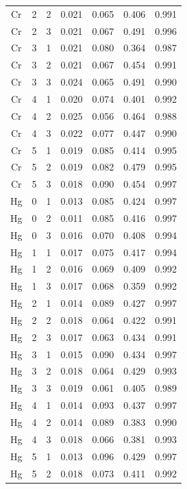 \documentclass[ms, hidelinks]{uncgdissertationexp}
\theoremstyle{plain}
\theoremstyle{definition}
\theoremstyle{remark}
\begin{document}
\begin{longtable}{ccccccc}
Cr & 2 & 2 & 0.021 & 0.065 & 0.406 & 0.991\\
\rowcolor{gray!6}  Cr & 2 & 3 & 0.021 & 0.067 & 0.491 & 0.996\\
Cr & 3 & 1 & 0.021 & 0.080 & 0.364 & 0.987\\
\rowcolor{gray!6}  Cr & 3 & 2 & 0.021 & 0.067 & 0.454 & 0.991\\
Cr & 3 & 3 & 0.024 & 0.065 & 0.491 & 0.990\\
\rowcolor{gray!6}  Cr & 4 & 1 & 0.020 & 0.074 & 0.401 & 0.992\\
Cr & 4 & 2 & 0.025 & 0.056 & 0.464 & 0.988\\
\rowcolor{gray!6}  Cr & 4 & 3 & 0.022 & 0.077 & 0.447 & 0.990\\
Cr & 5 & 1 & 0.019 & 0.085 & 0.414 & 0.995\\
\rowcolor{gray!6}  Cr & 5 & 2 & 0.019 & 0.082 & 0.479 & 0.995\\
Cr & 5 & 3 & 0.018 & 0.090 & 0.454 & 0.997\\
\rowcolor{gray!6}  Hg & 0 & 1 & 0.013 & 0.085 & 0.424 & 0.997\\
Hg & 0 & 2 & 0.011 & 0.085 & 0.416 & 0.997\\
\rowcolor{gray!6}  Hg & 0 & 3 & 0.016 & 0.070 & 0.408 & 0.994\\
Hg & 1 & 1 & 0.017 & 0.075 & 0.417 & 0.994\\
\rowcolor{gray!6}  Hg & 1 & 2 & 0.016 & 0.069 & 0.409 & 0.992\\
Hg & 1 & 3 & 0.017 & 0.068 & 0.359 & 0.992\\
\rowcolor{gray!6}  Hg & 2 & 1 & 0.014 & 0.089 & 0.427 & 0.997\\
Hg & 2 & 2 & 0.018 & 0.064 & 0.422 & 0.991\\
\rowcolor{gray!6}  Hg & 2 & 3 & 0.017 & 0.063 & 0.434 & 0.991\\
Hg & 3 & 1 & 0.015 & 0.090 & 0.434 & 0.997\\
\rowcolor{gray!6}  Hg & 3 & 2 & 0.018 & 0.064 & 0.429 & 0.993\\
Hg & 3 & 3 & 0.019 & 0.061 & 0.405 & 0.989\\
\rowcolor{gray!6}  Hg & 4 & 1 & 0.014 & 0.093 & 0.437 & 0.997\\
Hg & 4 & 2 & 0.014 & 0.089 & 0.383 & 0.990\\
\rowcolor{gray!6}  Hg & 4 & 3 & 0.018 & 0.066 & 0.381 & 0.993\\
Hg & 5 & 1 & 0.013 & 0.096 & 0.429 & 0.997\\
\rowcolor{gray!6}  Hg & 5 & 2 & 0.018 & 0.073 & 0.411 & 0.992\\

\end{longtable}
\end{document}
